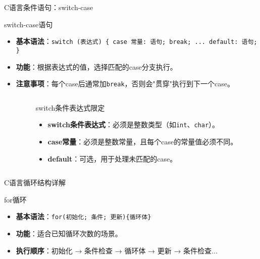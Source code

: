 \documentclass[UTF8,aspectratio=169]{beamer}
\begin{document}
\begin{frame}[fragile]{C语言条件语句：switch-case}
    \begin{ytublock}{switch-case语句}
        \begin{itemize}
            \item \textbf{基本语法}：\texttt{switch (表达式) \{ case 常量: 语句; break; ... default: 语句; \}}
            \item \textbf{功能}：根据表达式的值，选择匹配的case分支执行。
            \item \textbf{注意事项}：每个case后通常加\texttt{break}，否则会"贯穿"执行到下一个case。
        \end{itemize}
    \end{ytublock}
    \begin{columns}
        \begin{column}{0.48\textwidth}
            \inputminted[firstline=28,lastline=38]{cpp}{code/c_control_structures.c}
        \end{column}
        \begin{column}{0.48\textwidth}
            \begin{ytublock}{switch条件表达式限定}
                \begin{itemize}
                    \item \textbf{switch条件表达式}：必须是整数类型（如\texttt{int}、\texttt{char}）。
                    \item \textbf{case常量}：必须是整数常量，且每个case的常量值必须不同。
                    \item \textbf{default}：可选，用于处理未匹配的case。
                \end{itemize}
            \end{ytublock}
        \end{column}
    \end{columns}
\end{frame}

\begin{frame}{C语言循环结构详解}
    \begin{ytublock}{for循环}
        \begin{itemize}
            \item \textbf{基本语法}：\texttt{for(初始化; 条件; 更新)\{循环体\}}
            \item \textbf{功能}：适合已知循环次数的场景。
            \item \textbf{执行顺序}：初始化 → 条件检查 → 循环体 → 更新 → 条件检查...
        \end{itemize}
    \end{ytublock}
    \inputminted[firstline=44,lastline=49]{cpp}{code/c_control_structures.c}
\end{frame}
\end{document}
